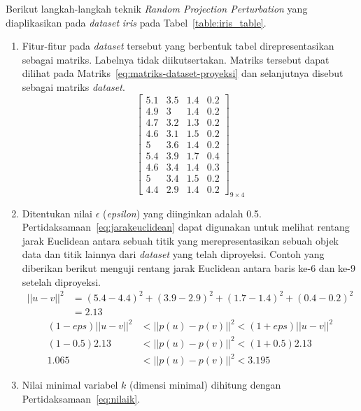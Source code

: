 Berikut langkah-langkah teknik \textit{Random Projection Perturbation} yang diaplikasikan pada \textit{dataset} \textit{iris} pada Tabel~\ref{table:iris_table}.
\begin{enumerate}
    \item Fitur-fitur pada \textit{dataset} tersebut yang berbentuk tabel direpresentasikan sebagai matriks. Labelnya tidak diikutsertakan. Matriks tersebut dapat dilihat pada Matriks~\ref{eq:matriks-dataset-proyeksi} dan selanjutnya disebut sebagai matriks \textit{dataset}.
    \begin{equation}\label{eq:matriks-dataset-proyeksi}
        \begin{bmatrix}
        5.1		&		3.5		&		1.4		&		0.2	\\
        4.9		&		3		&		1.4		&		0.2	\\
        4.7		&		3.2		&		1.3		&		0.2	\\
        4.6		&		3.1		&		1.5		&		0.2	\\
        5		&		3.6		&		1.4		&		0.2	\\
        5.4		&		3.9		&		1.7		&		0.4	\\
        4.6		&		3.4		&		1.4		&		0.3	\\
        5		&		3.4		&		1.5		&		0.2	\\
        4.4		&		2.9		&		1.4		&		0.2 
        \end{bmatrix}_{9\times 4}
    \end{equation}
    \item Ditentukan nilai \(\epsilon\) (\textit{epsilon}) yang diinginkan adalah 0.5. Pertidaksamaan~\ref{eq:jarakeuclidean} dapat digunakan untuk melihat rentang jarak Euclidean antara sebuah titik yang merepresentasikan sebuah objek data dan titik lainnya dari \textit{dataset} yang telah diproyeksi. Contoh yang diberikan berikut menguji rentang jarak Euclidean antara baris ke-6 dan ke-9 setelah diproyeksi.
    \begin{align*}
        ||u - v||^{2} &= (5.4-4.4)^2 + (3.9-2.9)^2 + (1.7-1.4)^2 + (0.4-0.2)^2
        \\
        &= 2.13
    \end{align*}
    \begin{align*}
        (1-eps)||u - v||^{2}&<||p(u) - p(v)||^{2}<(1+eps)||u - v||^{2}
        \\
        (1-0.5)2.13&<||p(u) - p(v)||^{2}<(1+0.5)2.13
        \\
        1.065&<||p(u) - p(v)||^{2}<3.195
    \end{align*}
    \item Nilai minimal variabel \(k\) (dimensi minimal) dihitung dengan Pertidaksamaan~\ref{eq:nilaik}.

\end{enumerate}
